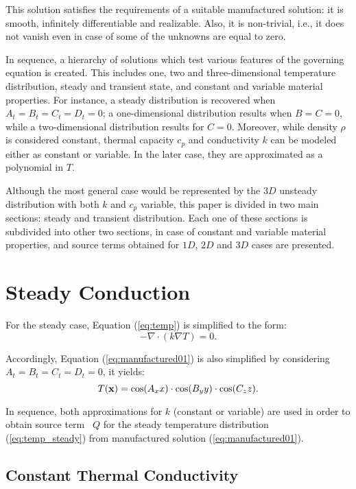\documentclass[a4paper,10pt]{article}
\begin{document}
This solution satisfies the requirements of a suitable manufactured solution: it is smooth,
infinitely differentiable and realizable. Also, it is non-trivial, i.e., it does not vanish even in case of
some of the unknowns are equal to zero.


In sequence, a hierarchy of solutions which test various features of the governing equation is created. This includes
one, two and three-dimensional temperature distribution, steady and transient state, and constant and variable
material properties. For instance, a steady distribution is recovered when
$A_t = B_t = C_t = D_t = 0$; a one-dimensional distribution results when $B = C = 0$, while a two-dimensional distribution
results for $C = 0$. Moreover, while density $\rho$ is considered constant, thermal capacity $c_p$ and conductivity $k$
can be modeled either as constant or variable. In the later case, they are approximated as a polynomial in $T$.

Although the most general case would be represented by the $3D$ unsteady distribution with both $k$ and $c_p$ variable,
this paper is divided in two main sections: steady and transient distribution. Each one of these sections is subdivided
into other two sections, in case of constant and variable material properties, and source terms obtained for $1D$, $2D$ and $3D$ cases are presented.


\section{Steady Conduction}
For the steady case, Equation (\ref{eq:temp}) is simplified to the form:
\begin{equation}
 \label{eq:temp_steady}
 - \nabla \cdot (k \nabla T) = 0.
\end{equation}

Accordingly, Equation (\ref{eq:manufactured01}) is also simplified by considering $A_t = B_t = C_t = D_t = 0$, it yields:
\begin{equation}
 \label{eq:manufactured02}
  T ({\bf x}) = \cos(A_x x ) \cdot \cos(B_y y ) \cdot \cos(C_z z ).
\end{equation}


In sequence, both approximations for $k$ (constant or variable) are used in order to obtain source term~ $Q$ for the steady temperature
distribution (\ref{eq:temp_steady}) from manufactured solution (\ref{eq:manufactured01}).
 
\subsection{Constant Thermal Conductivity}
\end{document}
